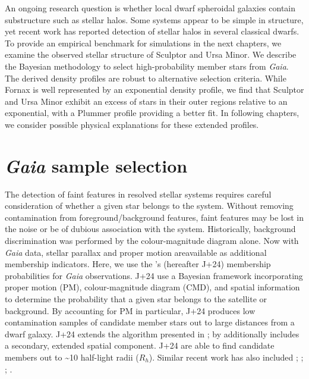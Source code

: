 An ongoing research question is whether local dwarf spheroidal galaxies
contain substructure such as stellar halos. Some systems appear to be
simple in structure, yet recent work has reported detection of stellar
halos in several classical dwarfs. To provide an empirical benchmark for
simulations in the next chapters, we examine the observed stellar
structure of Sculptor and Ursa Minor. We describe the
\citet{jensen+2024} Bayesian methodology to select high-probability
member stars from \emph{Gaia}. The derived density profiles are robust
to alternative selection criteria. While Fornax is well represented by
an exponential density profile, we find that Sculptor and Ursa Minor
exhibit an excess of stars in their outer regions relative to an
exponential, with a Plummer profile providing a better fit. In following
chapters, we consider possible physical explanations for these extended
profiles.

\section{\texorpdfstring{\emph{Gaia} sample
selection}{Gaia sample selection}}\label{gaia-sample-selection}

The detection of faint features in resolved stellar systems requires
careful consideration of whether a given star belongs to the system.
Without removing contamination from foreground/background features,
faint features may be lost in the noise or be of dubious association
with the system. Historically, background discrimination was performed
by the colour-magnitude diagram alone. Now with \emph{Gaia} data,
stellar parallax and proper motion areavailable as additional membership
indicators. Here, we use the \citet{jensen+2024}'s (hereafter J+24)
membership probabilities for \emph{Gaia} observations. J+24 use a
Bayesian framework incorporating proper motion (PM), colour-magnitude
diagram (CMD), and spatial information to determine the probability that
a given star belongs to the satellite or background. By accounting for
PM in particular, J+24 produces low contamination samples of candidate
member stars out to large distances from a dwarf galaxy. J+24 extends
the algorithm presented in \citet{MV2020a}; \citet{MV2020b} by
additionally includes a secondary, extended spatial component. J+24 are
able to find candidate members out to \textasciitilde10 half-light radii
(\(R_h\)). Similar recent work has also included \citet{pace+li2019};
\citet{battaglia+2022}; \citet{pace+erkal+li2022}; \citet{qi+2022}.

